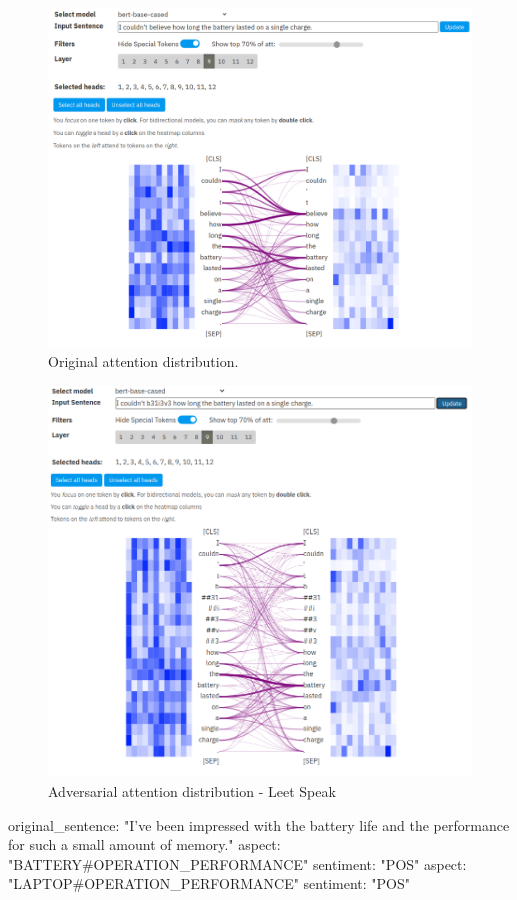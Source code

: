 \begin{figure}
    \centering
    \includegraphics[width =.8\textwidth]{img/attention_leet_origianl.png}
    \caption{Original attention distribution.}
    \label{fig:attention_leet_original}
\end{figure}

\begin{figure}
    \centering
    \includegraphics[width =.8\textwidth]{img/attention_leet_modified.png}
    \caption{Adversarial attention distribution - Leet Speak}
    \label{fig:attention_leet_modified}
\end{figure}


original_sentence: "I've been impressed with the battery life and the performance for such a small amount of memory."
aspect: "BATTERY#OPERATION_PERFORMANCE"
sentiment: "POS"
aspect: "LAPTOP#OPERATION_PERFORMANCE"
sentiment: "POS"

